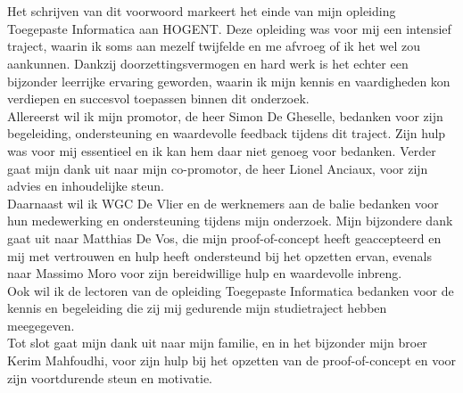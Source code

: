 
\chapter*{}%
\label{ch:voorwoord}
\TODO

Het schrijven van dit voorwoord markeert het einde van mijn opleiding Toegepaste Informatica aan HOGENT. Deze opleiding was voor mij een intensief traject, waarin ik soms aan mezelf twijfelde en me afvroeg of ik het wel zou aankunnen. Dankzij doorzettingsvermogen en hard werk is het echter een bijzonder leerrijke ervaring geworden, waarin ik mijn kennis en vaardigheden kon verdiepen en succesvol toepassen binnen dit onderzoek. \\

Allereerst wil ik mijn promotor, de heer Simon De Gheselle, bedanken voor zijn begeleiding, ondersteuning en waardevolle feedback tijdens dit traject. Zijn hulp was voor mij essentieel en ik kan hem daar niet genoeg voor bedanken. Verder gaat mijn dank uit naar mijn co-promotor, de heer Lionel Anciaux, voor zijn advies en inhoudelijke steun. \\

Daarnaast wil ik WGC De Vlier en de werknemers aan de balie bedanken voor hun medewerking en ondersteuning tijdens mijn onderzoek. Mijn bijzondere dank gaat uit naar Matthias De Vos, die mijn proof-of-concept heeft geaccepteerd en mij met vertrouwen en hulp heeft ondersteund bij het opzetten ervan, evenals naar Massimo Moro voor zijn bereidwillige hulp en waardevolle inbreng. \\

Ook wil ik de lectoren van de opleiding Toegepaste Informatica bedanken voor de kennis en begeleiding die zij mij gedurende mijn studietraject hebben meegegeven. \\

Tot slot gaat mijn dank uit naar mijn familie, en in het bijzonder mijn broer Kerim Mahfoudhi, voor zijn hulp bij het opzetten van de proof-of-concept en voor zijn voortdurende steun en motivatie. \\

